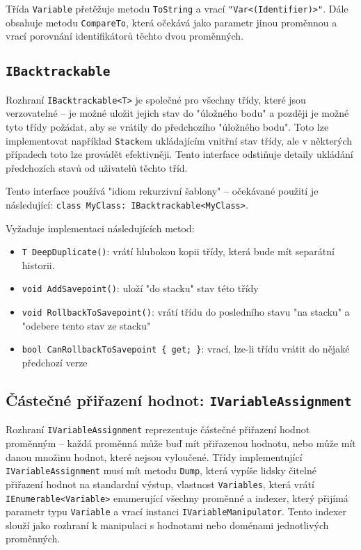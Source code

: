 \documentclass[a4paper]{article}
\begin{document}
Třída \texttt{Variable} přetěžuje metodu \texttt{ToString} a vrací
\texttt{"Var<(Identifier)>"}. Dále obsahuje metodu \texttt{CompareTo}, která
očekává jako parametr jinou proměnnou a vrací porovnání identifikátorů těchto
dvou proměnných.

\subsection{\texttt{IBacktrackable}}
Rozhraní \texttt{IBacktrackable<T>} je společné pro všechny třídy, které jsou
verzovatelné -- je možné uložit jejich stav do "úložného bodu" a později je
možné tyto třídy požádat, aby se vrátily do předchozího "úložného bodu".
Toto lze implementovat například \texttt{Stack}em ukládajícím vnitřní stav
třídy, ale v některých případech toto lze provádět efektivněji. Tento interface
odstiňuje detaily ukládání předchozích stavů od uživatelů těchto tříd.

Tento interface používá "idiom rekurzivní šablony" -- očekávané použití je
následující: \texttt{class MyClass: IBacktrackable<MyClass>}.

Vyžaduje implementaci následujících metod:
\begin{itemize}
\item \texttt{T DeepDuplicate()}: vrátí hlubokou kopii třídy, která bude mít
	separátní historii.
\item \texttt{void AddSavepoint()}: uloží "do stacku" stav této třídy
\item \texttt{void RollbackToSavepoint()}: vrátí třídu do posledního stavu "na
	stacku" a "odebere tento stav ze stacku"
\item \texttt{bool CanRollbackToSavepoint \{ get; \}}: vrací, lze-li
	třídu vrátit do nějaké předchozí verze
\end{itemize}

\subsection{Částečné přiřazení hodnot: \texttt{IVariableAssignment}}
Rozhraní \texttt{IVariableAssignment} reprezentuje částečné přiřazení hodnot
proměnným -- každá proměnná může buď mít přiřazenou hodnotu, nebo může mít danou
množinu hodnot, které nejsou vyloučené. Třídy implementující
\texttt{IVariableAssignment} musí mít metodu \texttt{Dump}, která vypíše lidsky
čitelné přiřazení hodnot na standardní výstup, vlastnost \texttt{Variables},
která vrátí \texttt{IEnumerable<Variable>} enumerující všechny proměnné a
indexer, který přijímá parametr typu \texttt{Variable} a vrací instanci
\texttt{IVariableManipulator}. Tento indexer slouží jako rozhraní k manipulaci
s hodnotami nebo doménami jednotlivých proměnných.
\end{document}
